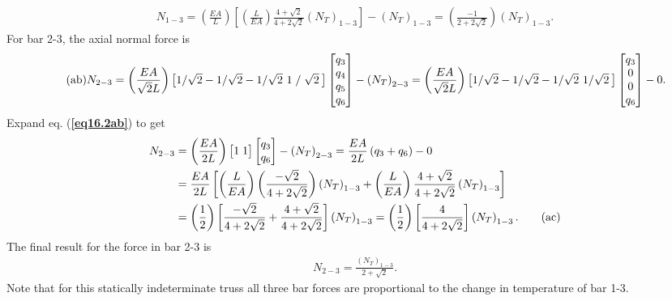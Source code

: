 \documentclass{AeroStructure-ERJohnson}
\begin{document}
\begin{example}
\begin{align}\label{eq16.2aa}\tag{aa}
N_{1-3}=\left(\frac{E A}{L}\right)\left[\left(\frac{L}{E A}\right) \frac{4+\sqrt{2}}{4+2 \sqrt{2}}\left(N_{T}\right)_{1-3}\right]-\left(N_{T}\right)_{1-3}=\left(\frac{-1}{2+2 \sqrt{2}}\right)\left(N_{T}\right)_{1-3}.
\end{align}
For bar 2-3, the axial normal force is\vspace*{-3pt}
\begin{align}\label{eq16.2ab}\tag{ab}
N_{2-3}=\left(\frac{E A}{\sqrt{2} L}\right)\left[\begin{array}{@{}lll@{}}1 / \sqrt{2}-1 / \sqrt{2}-1 / \sqrt{2}\  1\; /\; \sqrt{2}\end{array}\hspace*{-3pt}\right]\left[\begin{array}{@{}l@{}}q_{3} \\
q_{4} \\q_{5} \\q_{6}\end{array}\right]-\left(N_{T}\right)_{2-3}=\left(\frac{E A}{\sqrt{2} L}\right)\left[\begin{array}{@{}lll@{}}1 / \sqrt{2}-1 / \sqrt{2}-1 / \sqrt{2}\  1 / \sqrt{2}\end{array}\hspace*{-3pt}\right]\left[\begin{array}{@{}c@{}}q_{3} \\0 \\0 \\q_{6}\end{array}\right]-0.
\end{align}
Expand eq. (\textbf{\ref{eq16.2ab}}) to get
\begin{align}
N_{2-3}&=\left(\frac{E A}{2 L}\right)\left[\begin{array}{@{}l@{\;}l@{}}1 & 1\end{array}\right]\left[\begin{array}{@{}l@{}}q_{3} \\q_{6}\end{array}\right]-\left(N_{T}\right)_{2-3}=\frac{E A}{2 L}\left(q_{3}+q_{6}\right)-0 \nonumber\\
&=\frac{E A}{2 L}\left[\left(\frac{L}{E A}\right)\left(\frac{-\sqrt{2}}{4+2 \sqrt{2}}\right)\left(N_{T}\right)_{1-3}+\left(\frac{L}{E A}\right) \frac{4+\sqrt{2}}{4+2 \sqrt{2}}\left(N_{T}\right)_{1-3}\right] \nonumber\\
&=\left(\frac{1}{2}\right)\left[\frac{-\sqrt{2}}{4+2 \sqrt{2}}+\frac{4+\sqrt{2}}{4+2 \sqrt{2}}\right]\left(N_{T}\right)_{1-3}=\left(\frac{1}{2}\right)\left[\frac{4}{4+2 \sqrt{2}}\right]\left(N_{T}\right)_{1-3}.\label{eq16.2ac}\tag{ac}
\end{align}
The final result for the force in bar 2-3 is
\begin{align}\label{eq16.2ad}\tag{ad}
N_{2-3}=\frac{\left(N_{T}\right)_{1-3}}{2+\sqrt{2}}.
\end{align}
Note that for this statically indeterminate truss all three bar forces are proportional to the change in temperature of bar 1-3.
\end{example}
\end{document}
